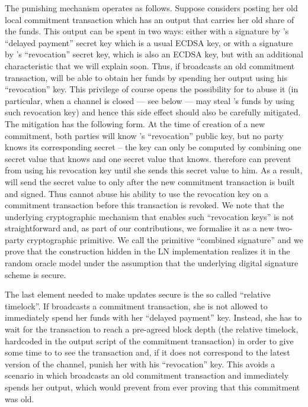     The punishing mechanism operates as follows. Suppose \alice{}
    considers posting her
    old local commitment transaction which  has an output that carries her old share of the funds. This output can be spent in two ways: either with a signature by \alice's ``delayed payment'' secret key which is a usual ECDSA key, or with a
    signature by \bob's ``revocation'' secret key, which is also an ECDSA key,
    but with an additional characteristic that we will explain soon. Thus, if \alice{}
    broadcasts an old commitment transaction, \bob{} will be able to obtain her
    funds by spending her output using his ``revocation'' key. This privilege 
    of course 
    opens the possibility for \bob{} to abuse it
    (in particular, when a channel is closed --- see below --- \bob{} may steal
    \alice's funds by using such revocation key)
    and hence this side effect 
    should also 
    be carefully mitigated. The mitigation has the following form. At the time of
    creation of a new commitment, both parties will know \bob's ``revocation'' public
    key, but no party knows its corresponding secret -- the key
    can only be computed by
    combining one secret value that \alice{} knows and one secret value 
    that \bob{} knows.
    \alice{} therefore can prevent \bob{} from using his revocation key until
    she  sends  this secret value to him. 
    As a result, \alice{} will send the secret value to \bob{} only after the new commitment transaction is built and signed.
    Thus \bob{} cannot abuse his ability to use the revocation key on a
    commitment transaction before this transaction is revoked. 
    We note that the underlying cryptographic mechanism  
    that enables such ``revocation keys''  is not straightforward 
    and, as part of our contributions, we formalise it as a new two-party 
    cryptographic primitive. We call the primitive ``combined signature'' and we 
    prove that the construction hidden in the LN implementation realizes it in the random oracle model under
    the assumption that the underlying digital signature scheme is secure.

    The last element needed to make updates secure is the so called ``relative
    timelock''. If \alice{} broadcasts a commitment transaction, she is not
    allowed to immediately spend her funds with her ``delayed payment'' key.
    Instead, she has to wait for the transaction to reach a pre-agreed block
    depth (the relative timelock, hardcoded in the output script of the
    commitment transaction) in order to give some time to \bob{} to see the
    transaction and, if it does not correspond to the latest version of the
    channel, punish her with his ``revocation'' key. This avoids a scenario in
    which \alice{} broadcasts an old commitment transaction and immediately
    spends her output, which would prevent \bob{} from ever proving that this
    commitment was old.


